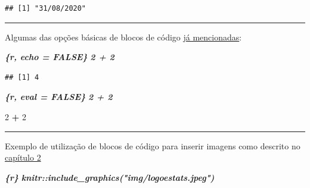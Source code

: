 \documentclass[
]{book}
\newenvironment{Shaded}{\begin{snugshade}}{\end{snugshade}}
\newcommand{\DecValTok}[1]{\textcolor[rgb]{0.00,0.00,0.81}{#1}}
\newcommand{\InformationTok}[1]{\textcolor[rgb]{0.56,0.35,0.01}{\textbf{\textit{#1}}}}
\newcommand{\OperatorTok}[1]{\textcolor[rgb]{0.81,0.36,0.00}{\textbf{#1}}}
\newcommand{\StringTok}[1]{\textcolor[rgb]{0.31,0.60,0.02}{#1}}
\begin{document}
\begin{verbatim}
## [1] "31/08/2020"
\end{verbatim}

\begin{center}\rule{0.5\linewidth}{0.5pt}\end{center}

Algumas das opções básicas de blocos de código \protect\hyperlink{flags}{já mencionadas}:

\begin{Shaded}
\begin{Highlighting}[]
\InformationTok{\textasciigrave{}\textasciigrave{}\textasciigrave{}\{r, echo = FALSE\}}
\InformationTok{2 + 2}
\InformationTok{\textasciigrave{}\textasciigrave{}\textasciigrave{}}
\end{Highlighting}
\end{Shaded}

\begin{verbatim}
## [1] 4
\end{verbatim}

\begin{Shaded}
\begin{Highlighting}[]
\InformationTok{\textasciigrave{}\textasciigrave{}\textasciigrave{}\{r, eval = FALSE\}}
\InformationTok{2 + 2}
\InformationTok{\textasciigrave{}\textasciigrave{}\textasciigrave{}}
\end{Highlighting}
\end{Shaded}

\begin{Shaded}
\begin{Highlighting}[]
\DecValTok{2} \OperatorTok{+}\StringTok{ }\DecValTok{2}
\end{Highlighting}
\end{Shaded}

\begin{center}\rule{0.5\linewidth}{0.5pt}\end{center}

Exemplo de utilização de blocos de código para inserir imagens como descrito no \protect\hyperlink{inserindo-imagens}{capítulo 2}

\begin{Shaded}
\begin{Highlighting}[]
\InformationTok{\textasciigrave{}\textasciigrave{}\textasciigrave{}\{r\}}
\InformationTok{knitr::include\_graphics("img/logoestats.jpeg")}
\InformationTok{\textasciigrave{}\textasciigrave{}\textasciigrave{}}
\end{Highlighting}
\end{Shaded}
\end{document}
